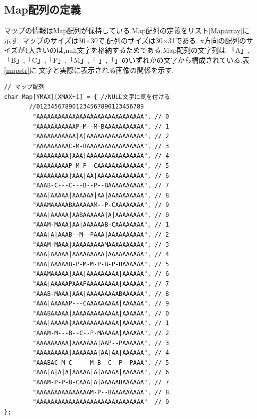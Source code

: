 \documentclass[a4j]{jarticle}
\begin{document}
    \subsection{Map配列の定義}
    マップの情報はMap配列が保持している.Map配列の定義をリスト\ref{Maparray}に示す.
    マップのサイズは30$\times$30で,配列のサイズは30$\times$31である.
    x方向の配列のサイズが1大きいのは,null文字を格納するためである.Map配列の文字列は
    「A」,「B」,「C」,「P」,「M」,「-」,「\textbar」のいずれかの文字から構成されている.表\ref{mapstr}に
    文字と実際に表示される画像の関係を示す.
    \begin{lstlisting}[basicstyle=\ttfamily\footnotesize, frame=single,label=Maparray,caption=Map配列の定義]
// マップ配列
char Map[YMAX][XMAX+1] = { //NULL文字に気を付ける
       //012345678901234567890123456789      
        "AAAAAAAAAAAAAAAAAAAAAAAAAAAAAA", // 0
        "AAAAAAAAAAAP-M--M-BAAAAAAAAAAA", // 1
        "AAAAAAAAAAA|A|AAAAAAAAAAAAAAAA", // 2
        "AAAAAAAAAC-M-BAAAAAAAAAAAAAAAA", // 3
        "AAAAAAAAA|AAA|AAAAAAAAAAAAAAAA", // 4
        "AAAAAAAAAP-M-P--CAAAAAAAAAAAAA", // 5
        "AAAAAAAAA|AAA|AA|AAAAAAAAAAAAA", // 6
        "AAAB-C---C---B--P--BAAAAAAAAAA", // 7
        "AAA|AAAAA|AAAAAA|AA|AAAAAAAAAA", // 8
        "AAAMAAAAABAAAAAAM--P-CAAAAAAAA", // 9
        "AAA|AAAAA|AABAAAAAA|A|AAAAAAAA", // 0
        "AAAM-MAAA|AA|AAAAAAB-CAAAAAAAA", // 1
        "AAA|A|AAAB--M--PAAA|AAAAAAAAAA", // 2
        "AAAM-MAAA|AAAAAAAAAMAAAAAAAAAA", // 3
        "AAA|AAAAA|AAAAAAAAA|AAAAAAAAAA", // 4
        "AAA|AAAAAB-P-M-M-P-B-P-BAAAAAA", // 5
        "AAAMAAAAA|AAA|AAAAAAAAA|AAAAAA", // 6
        "AAA|AAAAAPAAAPAAAAAAAAA|AAAAAA", // 7
        "AAAB-MAAA|AAA|AAAAAAAAABAAAAAA", // 8
        "AAA|AAAAAP---CAAAAAAAAA|AAAAAA", // 9
        "AAABAAAAA|AAAAAAAAAAAAA|AAAAAA", // 0
        "AAA|AAAAA|AAAAAAAAAAAAA|AAAAAA", // 1
        "AAAM-M---B--C--P-MAAAAA|AAAAAA", // 2
        "AAAAAAAAA|AAAAAAA|AAP--PAAAAAA", // 3
        "AAAAAAAAA|AAAAAAA|AA|AA|AAAAAA", // 4
        "AAABAC-M-C-----M-B--C--P--PAAA", // 5
        "AAA|A|A|A|AAAAA|A|AAAAA|AAAAAA", // 6
        "AAAM-P-P-B-CAAA|A|AAAAABAAAAAA", // 7
        "AAAAAAAAAAAAAAAM-P--BAAAAAAAAA", // 8
        "AAAAAAAAAAAAAAAAAAAAAAAAAAAAAA"  // 9
};
    \end{lstlisting}
\end{document}
